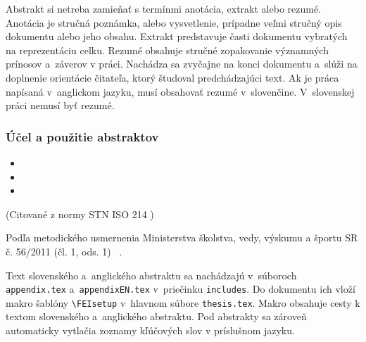 Abstrakt si netreba zamieňať s termínmi anotácia,
extrakt alebo rezumé.
Anotácia je stručná poznámka, alebo vysvetlenie,
prípadne veľmi stručný opis dokumentu alebo jeho obsahu.
Extrakt predstavuje časti dokumentu vybratých
na reprezentáciu celku.
Rezumé obsahuje stručné zopakovanie významných prínosov
a~záverov v práci.
Nachádza sa zvyčajne na konci dokumentu
a~slúži na doplnenie orientácie čitateľa,
ktorý študoval predchádzajúci text.
Ak je práca napísaná v~anglickom jazyku,
musí obsahovať rezumé v~slovenčine.
V~slovenskej práci nemusí byť rezumé.

\subsubsection{Účel a použitie abstraktov}
\begin{itemize}\itshape
  \item {}

  \item {}

  \item {}
\end{itemize}
\begin{flushright}
(Citované z normy STN ISO 214 \cite{iso214})
\end{flushright}

Podľa metodického usmernenia Ministerstva školstva, vedy, výskumu a športu SR č. 56/2011 (čl. 1, ods. 1)
\emph{}~\cite{usmernenie562011}.

Text slovenského a~anglického abstraktu sa nachádzajú
v~súboroch \verb|appendix.tex| a~\verb|appendixEN.tex| v~priečinku \verb|includes|.
Do dokumentu ich vloží makro šablóny
\verb|\FEIsetup| v~hlavnom súbore \verb|thesis.tex|.
Makro obsahuje cesty k textom slovenského a~anglického abstraktu.
Pod abstrakty sa zároveň automaticky vytlačia
zoznamy kľúčových slov v príslušnom jazyku.

